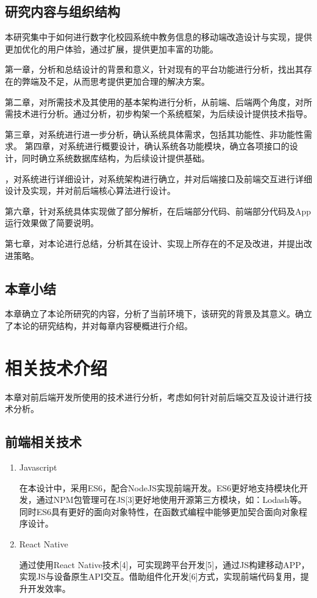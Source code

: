 \documentclass[oneside]{jufethesis}
\begin{document}
\subsection{研究内容与组织结构}

本研究集中于如何进行数字化校园系统中教务信息的移动端改造设计与实现，提供更加优化的用户体验，通过扩展，提供更加丰富的功能。

第一章，分析和总结设计的背景和意义，针对现有的平台功能进行分析，找出其存在的弊端及不足，从而思考提供更加合理的解决方案。

第二章，对所需技术及其使用的基本架构进行分析，从前端、后端两个角度，对所需技术进行分析。通过分析，初步构架一个系统框架，为后续设计提供技术指导。

第三章，对系统进行进一步分析，确认系统具体需求，包括其功能性、非功能性需求。
第四章，对系统进行概要设计，确认系统各功能模块，确立各项接口的设计，同时确立系统数据库结构，为后续设计提供基础。

，对系统进行详细设计，对系统架构进行确立，并对后端接口及前端交互进行详细设计及实现，并对前后端核心算法进行设计。

第六章，针对系统具体实现做了部分解析，在后端部分代码、前端部分代码及App运行效果做了简要说明。

第七章，对本论进行总结，分析其在设计、实现上所存在的不足及改进，并提出改进策略。

\subsection{本章小结}

本章确立了本论所研究的内容，分析了当前环境下，该研究的背景及其意义。确立了本论的研究结构，并对每章内容梗概进行介绍。

\section{相关技术介绍}

本章对前后端开发所使用的技术进行分析，考虑如何针对前后端交互及设计进行技术分析。

\subsection{前端相关技术}
\begin{enumerate}[(1)]
  \item Javascript
  
  在本设计中，采用ES6，配合NodeJS实现前端开发。ES6更好地支持模块化开发，通过NPM包管理可在JS[3]更好地使用开源第三方模块，如：Lodash等。同时ES6具有更好的面向对象特性，在函数式编程中能够更加契合面向对象程序设计。

  \item React Native
  
  通过使用React Native技术[4]，可实现跨平台开发[5]，通过JS构建移动APP，实现JS与设备原生API交互。借助组件化开发[6]方式，实现前端代码复用，提升开发效率。
  
\end{enumerate}
\end{document}
